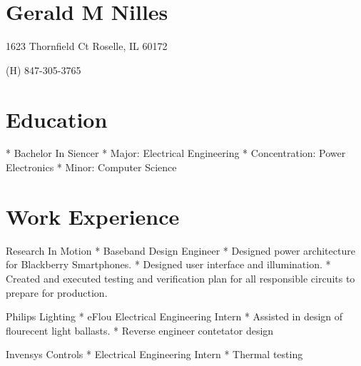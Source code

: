 \documentclass[12pt, letterpaper]{article}
\begin{document}
\section{Gerald M Nilles}

1623 Thornfield Ct
Roselle, IL 60172

(H) 847-305-3765


\section{Education}
* Bachelor In Siencer
    * Major: Electrical Engineering
        * Concentration: Power Electronics
    * Minor: Computer Science

\section{Work Experience}
Research In Motion
* Baseband Design Engineer
    * Designed power architecture for Blackberry Smartphones.
    * Designed user interface and illumination.
    * Created and executed testing and verification plan for all responsible circuits to prepare for production.


Philips Lighting
* eFlou Electrical Engineering Intern
    * Assisted in design of flourecent light ballasts.
    * Reverse engineer contetator design

Invensys Controls
* Electrical Engineering Intern
    * Thermal testing
\end{document}
